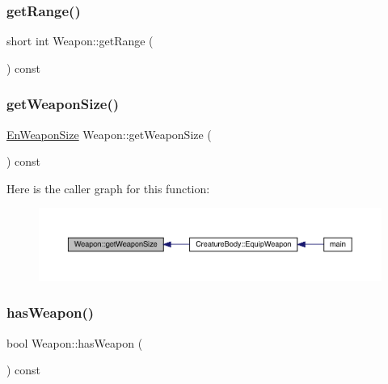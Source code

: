 \subsubsection{\texorpdfstring{get\+Range()}{getRange()}}
{\footnotesize\ttfamily short int Weapon\+::get\+Range (\begin{DoxyParamCaption}{ }\end{DoxyParamCaption}) const}

\mbox{\label{class_weapon_a459fd4ef8f2eefc9be73f05b6ec42bcd}} 
\subsubsection{\texorpdfstring{get\+Weapon\+Size()}{getWeaponSize()}}
{\footnotesize\ttfamily \mbox{\hyperlink{_weapon_8hpp_a160076f6c574c69cd1ce2b3f42cf3755}{En\+Weapon\+Size}} Weapon\+::get\+Weapon\+Size (\begin{DoxyParamCaption}{ }\end{DoxyParamCaption}) const}

Here is the caller graph for this function\+:
\nopagebreak
\begin{figure}[H]
\begin{center}
\leavevmode
\includegraphics[width=350pt]{db/de5/class_weapon_a459fd4ef8f2eefc9be73f05b6ec42bcd_icgraph}
\end{center}
\end{figure}
\mbox{\label{class_weapon_a99c74249e561d0130575a2278a982a6c}} 
\subsubsection{\texorpdfstring{has\+Weapon()}{hasWeapon()}}
{\footnotesize\ttfamily bool Weapon\+::has\+Weapon (\begin{DoxyParamCaption}{ }\end{DoxyParamCaption}) const}

